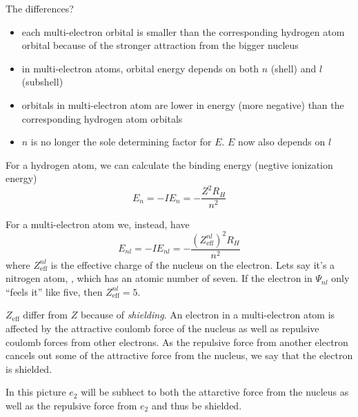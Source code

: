 \documentclass[../mit-general-chemistry.tex]{subfiles}
\begin{document}
The differences?
\begin{itemize}
\item each multi-electron orbital is smaller than the corresponding
  hydrogen atom orbital because of the stronger attraction from the
  bigger nucleus
\item in multi-electron atoms, orbital energy depends on both $n$
  (shell) and $l$ (subshell)
\item orbitals in multi-electron atom are lower in energy (more
  negative) than the corresponding hydrogen atom
  orbitals
\item $n$ is no longer the sole determining factor for $E$. $E$ now
  also depends on $l$
\end{itemize}


For a hydrogen atom, we can calculate the binding energy (negtive
ionization energy)
\begin{equation}
  E_n = -IE_n = -\frac{Z^2R_H}{n^2}
\end{equation}

For a multi-electron atom we, instead, have
\begin{equation}\label{eq:e:nl:multi}
  E_{nl} = -IE_{nl} = -\frac{\left(Z_{\text{eff}}^{nl}\right)^2 R_H}{n^2}
\end{equation}
where $Z_{\text{eff}}^{nl}$ is the effective charge of the nucleus on
the electron. Lets say it's a nitrogen atom, , which has an
atomic number of seven. If the electron in $\Psi_{nl}$ only ``feels
it'' like five, then $Z_{\text{eff}}^{nl} = 5$.

$Z_{\text{eff}}$ differ from $Z$ because of {\em shielding}. An
electron in a multi-electron atom is affected by the attractive
coulomb force of the nucleus as well as repulsive coulomb forces from
other electrons. As the repulsive force from another electron cancels
out some of the attractive force from the nucleus, we say that the
electron is shielded.

In this picture $e_2$ will be subhect to both the attarctive force
from the nucleus as well as the repulsive force from $e_2$ and thus be
shielded.
\end{document}
